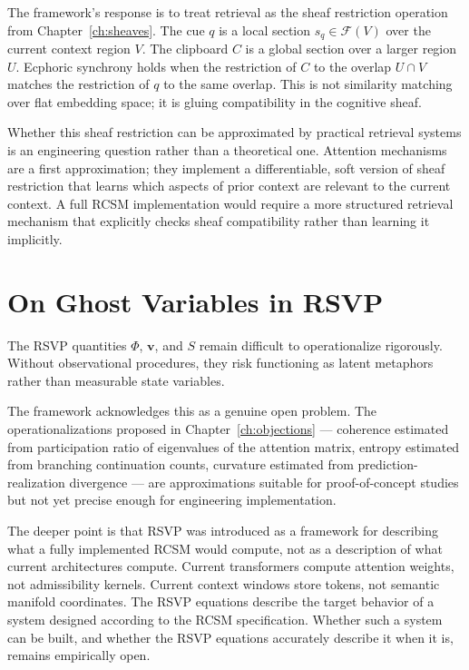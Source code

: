 \documentclass[12pt,oneside]{book}
\theoremstyle{plain}
\theoremstyle{definition}
\theoremstyle{plain}
\begin{document}
The framework's response is to treat retrieval as the sheaf restriction operation from Chapter~\ref{ch:sheaves}. The cue $q$ is a local section $s_q \in \mathcal{F}(V)$ over the current context region $V$. The clipboard $C$ is a global section over a larger region $U$. Ecphoric synchrony holds when the restriction of $C$ to the overlap $U \cap V$ matches the restriction of $q$ to the same overlap. This is not similarity matching over flat embedding space; it is gluing compatibility in the cognitive sheaf.

Whether this sheaf restriction can be approximated by practical retrieval systems is an engineering question rather than a theoretical one. Attention mechanisms are a first approximation; they implement a differentiable, soft version of sheaf restriction that learns which aspects of prior context are relevant to the current context. A full RCSM implementation would require a more structured retrieval mechanism that explicitly checks sheaf compatibility rather than learning it implicitly.

\section{On Ghost Variables in RSVP}

The RSVP quantities $\Phi$, $\mathbf{v}$, and $S$ remain difficult to operationalize rigorously. Without observational procedures, they risk functioning as latent metaphors rather than measurable state variables.

The framework acknowledges this as a genuine open problem. The operationalizations proposed in Chapter~\ref{ch:objections} — coherence estimated from participation ratio of eigenvalues of the attention matrix, entropy estimated from branching continuation counts, curvature estimated from prediction-realization divergence — are approximations suitable for proof-of-concept studies but not yet precise enough for engineering implementation.

The deeper point is that RSVP was introduced as a framework for describing what a fully implemented RCSM would compute, not as a description of what current architectures compute. Current transformers compute attention weights, not admissibility kernels. Current context windows store tokens, not semantic manifold coordinates. The RSVP equations describe the target behavior of a system designed according to the RCSM specification. Whether such a system can be built, and whether the RSVP equations accurately describe it when it is, remains empirically open.
\end{document}
